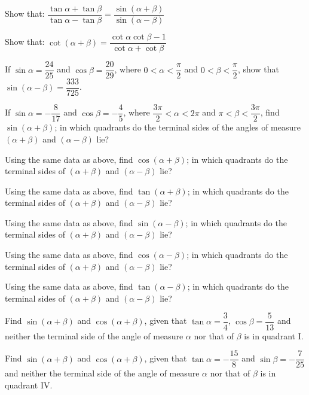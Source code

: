 \documentclass[11pt,a4paper]{article}
\begin{document}
\begin{longlist}
\item Show that: $\dfrac{\tan\alpha+\tan\beta}{\tan\alpha-\tan\beta}=\dfrac{\sin(\alpha+\beta)}{\sin(\alpha-\beta)}$

\item Show that: $\cot(\alpha+\beta)=\dfrac{\cot\alpha\cot\beta-1}{\cot\alpha+\cot\beta}$

\item If $\sin\alpha=\dfrac{24}{25}$ and $\cos\beta=\dfrac{20}{29}$, where $0<\alpha<\dfrac{\pi}{2}$ and $0<\beta<\dfrac{\pi}{2}$, show that $\sin(\alpha-\beta)=\dfrac{333}{725}$.

\item If $\sin\alpha=-\dfrac{8}{17}$ and $\cos\beta=-\dfrac{4}{5}$, where $\dfrac{3\pi}{2}<\alpha<2\pi$ and $\pi<\beta<\dfrac{3\pi}{2}$, find $\sin(\alpha+\beta)$; in which quadrants do the terminal sides of the angles of measure $(\alpha+\beta)$ and $(\alpha-\beta)$ lie?

\item Using the same data as above, find $\cos(\alpha+\beta)$; in which quadrants do the terminal sides of $(\alpha+\beta)$ and $(\alpha-\beta)$ lie?

\item Using the same data as above, find $\tan(\alpha+\beta)$; in which quadrants do the terminal sides of $(\alpha+\beta)$ and $(\alpha-\beta)$ lie?

\item Using the same data as above, find $\sin(\alpha-\beta)$; in which quadrants do the terminal sides of $(\alpha+\beta)$ and $(\alpha-\beta)$ lie?

\item Using the same data as above, find $\cos(\alpha-\beta)$; in which quadrants do the terminal sides of $(\alpha+\beta)$ and $(\alpha-\beta)$ lie?

\item Using the same data as above, find $\tan(\alpha-\beta)$; in which quadrants do the terminal sides of $(\alpha+\beta)$ and $(\alpha-\beta)$ lie?

\item Find $\sin(\alpha+\beta)$ and $\cos(\alpha+\beta)$, given that $\tan\alpha=\dfrac{3}{4}$, $\cos\beta=\dfrac{5}{13}$ and neither the terminal side of the angle of measure $\alpha$ nor that of $\beta$ is in quadrant I.

\item Find $\sin(\alpha+\beta)$ and $\cos(\alpha+\beta)$, given that $\tan\alpha=-\dfrac{15}{8}$ and $\sin\beta=-\dfrac{7}{25}$ and neither the terminal side of the angle of measure $\alpha$ nor that of $\beta$ is in quadrant IV.


\end{longlist}
\end{document}
